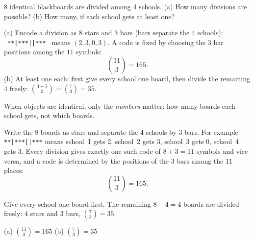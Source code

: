 
\begin{problem}
	8 identical blackboards are divided among 4 schools. (a) How many divisions
	are possible? (b) How many, if each school gets at least one?
\end{problem}

\begin{slides}
	\small
	\exstatement
	\pause
	\sol
	(a) Encode a division as 8 stars and 3 bars (bars separate the 4 schools):
	\ \texttt{**|***||***} \ means $(2,3,0,3)$. A code is fixed by choosing
	the 3 bar positions among the $11$ symbols:
	\[ \binom{11}{3} = 165. \]
	(b) At least one each: first give every school one board, then divide the
	remaining $4$ freely: $\binom{4+3}{3}=\binom{7}{3} = 35$.
\end{slides}

\begin{solution}
	\idea When objects are identical, only the \emph{numbers} matter: how many
	boards each school gets, not which boards.

	 Write the 8 boards as stars and separate the 4
	schools by 3 bars. For example \texttt{**|***||***} means school~1 gets 2,
	school~2 gets 3, school~3 gets 0, school~4 gets 3. Every division gives
	exactly one such code of $8+3=11$ symbols and vice versa, and a code is
	determined by the positions of the 3 bars among the 11 places:
	\[ \binom{11}{3}=165. \]

	 Give every school one board first. The
	remaining $8-4=4$ boards are divided freely: 4 stars and 3 bars,
	$\binom{7}{3}=35$.
	\begin{answer}
		(a) $\binom{11}3=165$ \qquad (b) $\binom73=35$
	\end{answer}
\end{solution}
